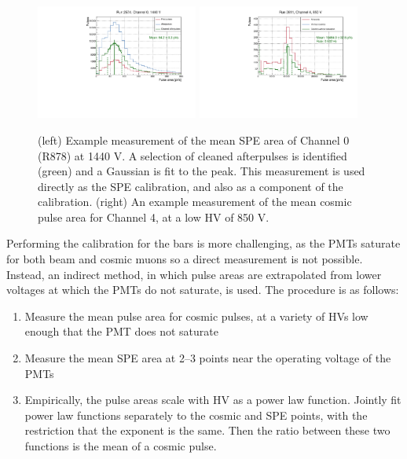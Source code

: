 {\begin{figure}[t]
  \begin{center}
    \includegraphics[width=0.475\textwidth]{figs/milliq/spe_area_hist.pdf}
    \includegraphics[width=0.475\textwidth]{figs/milliq/cosmic_area_hist.pdf}
    \caption{(left) Example measurement of the mean SPE area of Channel 0 (R878) at 1440 V.
      A selection of cleaned afterpulses is identified (green) and a Gaussian is fit to the peak.
      This measurement is used directly as the SPE calibration, and also as a component of the \Npe calibration.
      (right) An example measurement of the mean cosmic pulse area for Channel 4, at a low HV of 850 V.
            }
    \label{fig:spe_cosmic_area}
  \end{center}
\end{figure}

Performing the \Npe calibration for the bars is more challenging, as the PMTs saturate for
both beam and cosmic muons so a direct measurement is not possible. Instead, an indirect
method, in which pulse areas are extrapolated from lower voltages at which the PMTs do
not saturate, is used. The procedure is as follows:
\begin{enumerate}\setlength\itemsep{-1mm}
\item Measure the mean pulse area for cosmic pulses, at a variety of HVs low enough
that the PMT does not saturate
\item Measure the mean SPE area at 2--3 points near the operating voltage of the PMTs
\item Empirically, the pulse areas scale with HV as a power law function. Jointly fit
power law functions separately to the cosmic and SPE points, with the restriction that
the exponent is the same. Then the ratio between these two functions is the
mean \Npe of a cosmic pulse.
\end{enumerate}

}
